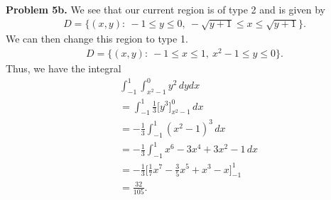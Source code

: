 \documentclass{report}
\begin{document}
    \bigbreak \noindent 
    \textbf{Problem 5b.} We see that our current region is of type 2 and is given by
    \begin{align*}
        D = \{(x,y):\ -1 \leq y \leq 0,\ -\sqrt{y+1} \leq x \leq\sqrt{y+1}\}
    .\end{align*}
    We can then change this region to type 1.
    \begin{align*}
        D = \{(x,y):\ -1 \leq x \leq 1,\ x^{2}-1 \leq y \leq 0\}
    .\end{align*}
    Thus, we have the integral
    \begin{align*}
        &\int_{-1}^{1}\int_{x^{2}-1}^{0} y^{2}\, dydx \\
        &=\int_{-1}^{1}  \frac{1}{3}\bigg[y^{3}\bigg]_{x^{2}-1}^{0}\, dx \\
        &=-\frac{1}{3}\int_{-1}^{1} (x^{2}-1)^{3} \, dx \\
        &=-\frac{1}{3}\int_{-1}^{1} x^{6} -3x^{4}+3x^{2}-1 \, dx \\
        &=-\frac{1}{3}\bigg[\frac{1}{7}x^{7}-\frac{3}{5}x^{5}+x^{3}-x\bigg]_{-1}^{1} \\
        &=\frac{32}{105}
    .\end{align*}






 
\end{document}
